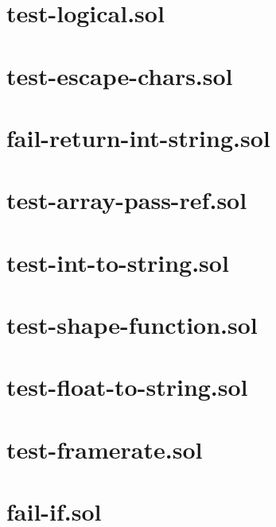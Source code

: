 \section{test-logical.sol}


\section{test-escape-chars.sol}


\section{fail-return-int-string.sol}


\section{test-array-pass-ref.sol}


\section{test-int-to-string.sol}


\section{test-shape-function.sol}


\section{test-float-to-string.sol}


\section{test-framerate.sol}


\section{fail-if.sol}


